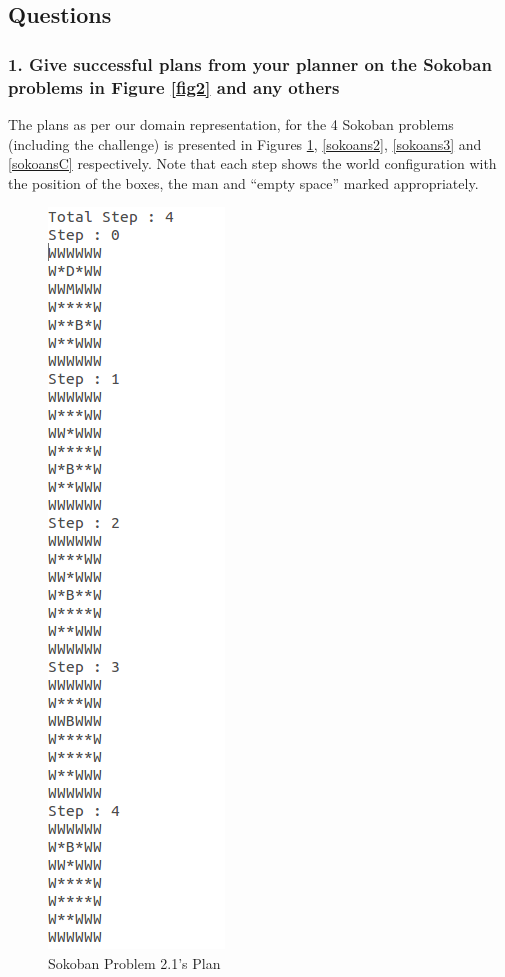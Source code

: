 \documentclass[10pt, letter]{article}
\begin{document}
\subsection{Questions}

\subsubsection*{1. Give successful plans from your planner on the Sokoban problems in Figure \ref{fig2} and any others}
The plans as per our domain representation, for the 4 Sokoban problems (including the challenge) is presented in Figures \ref{sokoans1}, \ref{sokoans2}, \ref{sokoans3} and \ref{sokoansC} respectively. Note that each step shows the world configuration with the position of the boxes, the man and ``empty space'' marked appropriately.
\begin{figure} [h!]
\centering
	\includegraphics[scale = 0.35]{images/sokoban1-ans}
\caption{Sokoban Problem 2.1's Plan}
\label{sokoans1}
\end{figure}
\end{document}
